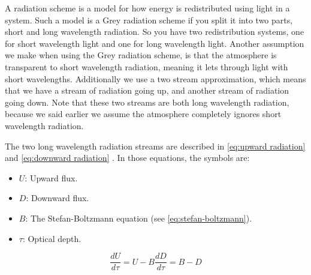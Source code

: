 A radiation scheme is a model for how energy is redistributed using light in a system. Such a model is a Grey radiation scheme if you split it into two parts, short and long wavelength radiation.
So you have two redistribution systems, one for short wavelength light and one for long wavelength light. Another assumption we make when using the Grey radiation scheme, is that the atmosphere 
is transparent to short wavelength radiation, meaning it lets through light with short wavelengths. Additionally we use a two stream approximation, which means that we have a stream of radiation
going up, and another stream of radiation going down. Note that these two streams are both long wavelength radiation, because we said earlier we assume the atmosphere completely ignores short 
wavelength radiation.

The two long wavelength radiation streams are described in \autoref{eq:upward radiation} and \autoref{eq:downward radiation} \cite{greyRad}. In those equations, the symbols are:

\begin{itemize}
    \item $U$: Upward flux.
    \item $D$: Downward flux.
    \item $B$: The Stefan-Boltzmann equation (see \autoref{eq:stefan-boltzmann}).
    \item $\tau$: Optical depth.
\end{itemize}

\begin{subequations}
    \begin{equation}
        \frac{dU}{d\tau} = U - B
        \label{eq:upward radiation}
    \end{equation}
    \begin{equation}
        \frac{dD}{d\tau} = B - D
        \label{eq:downward radiation}
    \end{equation}
\end{subequations}

